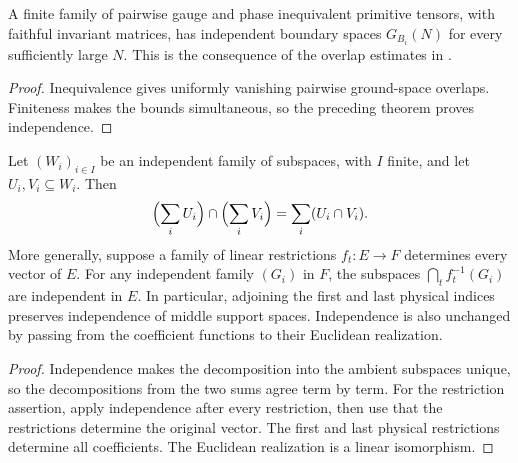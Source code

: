 \begin{lemma}
    \label{thm:primitive_ground_space_eventual_independence}
    \leanok
    A finite family of pairwise gauge and phase inequivalent primitive
    tensors, with faithful invariant matrices, has independent boundary
    spaces $G_{B_i}(N)$ for every sufficiently large $N$.
    This is the consequence of the overlap estimates in
    \cite[Lemmas disjoint and overlapestimate]{Nachtergaele1996Spectral}.
\end{lemma}
\begin{proof}\leanok
    Inequivalence gives uniformly vanishing pairwise ground-space
    overlaps. Finiteness makes the bounds simultaneous, so the preceding
    theorem proves independence.
\end{proof}

\begin{lemma}
    \label{thm:independent_ambient_sum_intersection}
    \leanok
    Let $(W_i)_{i\in I}$ be an independent family of subspaces, with $I$
    finite, and let $U_i,V_i\subseteq W_i$. Then
    \begin{align}
        \Bigl(\sum_i U_i\Bigr)\cap\Bigl(\sum_i V_i\Bigr)
        =\sum_i(U_i\cap V_i).
    \end{align}
    More generally, suppose a family of linear restrictions $f_t:E\to F$
    determines every vector of $E$. For any independent family $(G_i)$ in
    $F$, the subspaces $\bigcap_t f_t^{-1}(G_i)$ are independent in $E$.
    In particular, adjoining the first and last physical indices preserves
    independence of middle support spaces. Independence is also unchanged
    by passing from the coefficient functions to their Euclidean realization.
\end{lemma}
\begin{proof}\leanok
    Independence makes the decomposition into the ambient subspaces unique,
    so the decompositions from the two sums agree term by term.
    For the restriction assertion, apply independence after every
    restriction, then use that the restrictions determine the original vector.
    The first and last physical restrictions determine all coefficients.
    The Euclidean realization is a linear isomorphism.
\end{proof}

